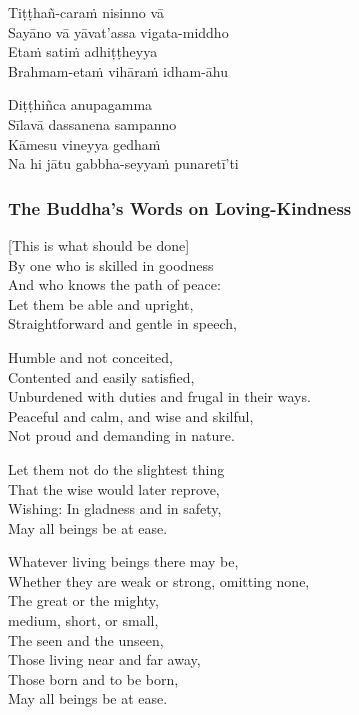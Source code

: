\begin{paritta}
Tiṭṭhañ-caraṁ nisinno vā\\
Sayāno vā yāvat'assa vigata-middho\\
Etaṁ satiṁ adhiṭṭheyya\\
Brahmam-etaṁ vihāraṁ idham-āhu

Diṭṭhiñca anupagamma\\
Sīlavā dassanena sampanno\\
Kāmesu vineyya gedhaṁ\\
Na hi jātu gabbha-seyyaṁ punaretī'ti


\end{paritta}

\clearpage

\subsubsection{The Buddha's Words on Loving-Kindness}

\begin{leader}
\end{leader}


[This is what should be done]\\
By one who is skilled in goodness\\
And who knows the path of peace:\\
Let them be able and upright,\\
Straightforward and gentle in speech,

Humble and not conceited,\\
Contented and easily satisfied,\\
Unburdened with duties and frugal in their ways.\\
Peaceful and calm, and wise and skilful,\\
Not proud and demanding in nature.

Let them not do the slightest thing\\
That the wise would later reprove,\\
Wishing: In gladness and in safety,\\
May all beings be at ease.

Whatever living beings there may be,\\
Whether they are weak or strong, omitting none,\\
The great or the mighty,\\
\vin medium, short, or small,\\
The seen and the unseen,\\
Those living near and far away,\\
Those born and to be born,\\
May all beings be at ease.

